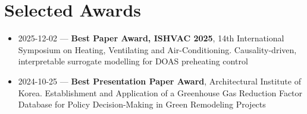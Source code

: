 \documentclass[10pt,a4paper]{article}
\begin{document}
\section*{Selected Awards}
\begin{itemize}[leftmargin=*]
\item 2025-12-02 --- \textbf{Best Paper Award, ISHVAC 2025}, 14th International Symposium on Heating, Ventilating and Air-Conditioning. Causality-driven, interpretable surrogate modelling for DOAS preheating control
\item 2024-10-25 --- \textbf{Best Presentation Paper Award}, Architectural Institute of Korea. Establishment and Application of a Greenhouse Gas Reduction Factor Database for Policy Decision-Making in Green Remodeling Projects
\end{itemize}
\end{document}
